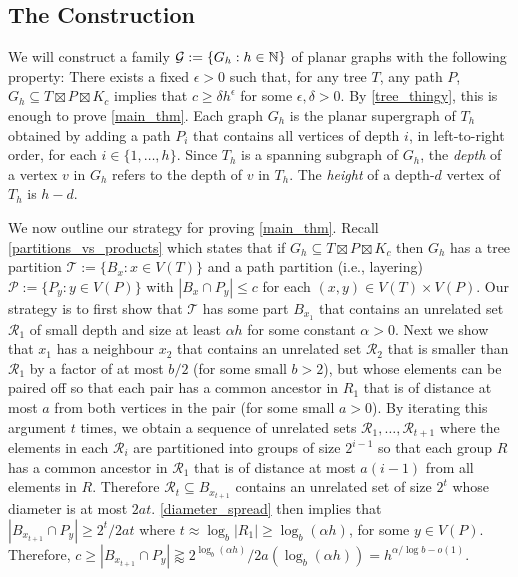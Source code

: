\documentclass{patmorin}
\newcommand{\defin}[1]{\emph{\color{brightmaroon}#1}}
\renewcommand{\le}{\leqslant}
\renewcommand{\ge}{\geqslant}
\begin{document}
\subsection{The Construction}


We will construct a family $\mathcal{G}:=\{G_{h}:h\in\mathbb{N}\}$ of planar graphs with the following property:  There exists a fixed $\epsilon >0$ such that, for any tree $T$, any path $P$, $G_{h}\subseteq T\boxtimes P\boxtimes K_c$ implies that $c\ge \delta h^\epsilon$ for some $\epsilon,\delta >0$.  By \cref{tree_thingy}, this is enough to prove \cref{main_thm}.  Each graph $G_{h}$ is the planar supergraph of $T_h$ obtained by adding a path $P_i$ that contains all vertices of depth $i$, in left-to-right order, for each $i\in\{1,\ldots,h\}$.   Since $T_h$ is a spanning subgraph of $G_h$, the \defin{depth} of a vertex $v$ in $G_h$ refers to the depth of $v$ in $T_h$.  The \defin{height} of a depth-$d$ vertex of $T_h$ is $h-d$.


We now outline our strategy for proving \cref{main_thm}.  Recall \cref{partitions_vs_products} which states that if $G_h\subseteq T\boxtimes P\boxtimes K_c$ then $G_h$ has a tree partition $\mathcal{T}:=\{B_x:x\in V(T)\}$ and a path partition (i.e., layering) $\mathcal{P}:=\{P_y:y\in V(P)\}$ with $|B_x\cap P_y|\le c$ for each $(x,y)\in V(T)\times V(P)$. Our strategy is to first show that $\mathcal{T}$ has some part $B_{x_1}$ that contains an unrelated set $\mathcal{R}_1$ of small depth and size at least $\alpha h$ for some constant $\alpha >0$.  Next we show that $x_1$ has a neighbour $x_2$ that contains an unrelated set $\mathcal{R}_2$ that is smaller than $\mathcal{R}_1$ by a factor of at most $b/2$ (for some small $b>2$), but whose elements can be paired off so that each pair has a common ancestor in $R_1$ that is of distance at most $a$ from both vertices in the pair (for some small $a>0$).  By iterating this argument $t$ times, we obtain a sequence of unrelated sets $\mathcal{R}_1,\ldots,\mathcal{R}_{t+1}$ where the elements in each $\mathcal{R}_i$ are partitioned into groups of size $2^{i-1}$ so that each group $R$ has a common ancestor in $\mathcal{R}_1$ that is of distance at most $a(i-1)$ from all elements in $R$.  Therefore $\mathcal{R}_t\subseteq B_{x_{t+1}}$ contains an unrelated set of size $2^{t}$ whose diameter is at most $2at$.  \cref{diameter_spread} then implies that $|B_{x_{t+1}}\cap P_y|\ge 2^{t}/2at$ where $t\approx\log_b |R_1|\ge \log_{b}(\alpha h)$, for some $y\in V(P)$. Therefore, $c\ge |B_{x_{t+1}}\cap P_y|\gtrapprox 2^{\log_{b}(\alpha h)}/2a(\log_{b}(\alpha h))=h^{\alpha/\log b-o(1)}$.
\end{document}
